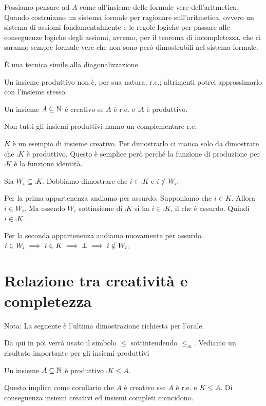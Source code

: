 Possiamo pensare ad $A$ come all'insieme delle formule vere dell'aritmetica. Quando costruiamo un
sistema formale per ragionare sull'aritmetica, ovvero un sistema di assiomi fondamentalmente e le regole
logiche per passare alle conseguenze logiche degli assiomi, avremo, per il teorema di incompletezza,
che ci saranno sempre formule vere che non sono però dimostrabili nel sistema formale.

È una tecnica simile alla diagonalizzazione.

Un insieme produttivo non è, per sua natura, r.e.; altrimenti potrei approssimarlo con l'insieme
stesso.

\begin{defn}
    Un insieme $A \subseteq \mathbb{N}$ è creativo se $A$ è r.e. e $\comp{A}$ è produttivo.
\end{defn}

Non tutti gli insiemi produttivi hanno un complementare r.e.

$K$ è un esempio di insieme creativo. Per dimostrarlo ci manca solo da dimostrare che $\comp{K}$ è
produttivo. Questo è semplice però perché la funzione di produzione per $\comp{K}$ è la funzione
identità.

Sia $W_{i} \subseteq \comp{K}$. Dobbiamo dimostrare che $i \in \comp{K}$ e $i \notin W_{i}$.

Per la prima appartenenza andiamo per assurdo. Supponiamo che $i \in K$. Allora $i \in W_{i}$. Ma
essendo $W_{i}$ sottinsieme di $\comp{K}$ si ha $i \in \comp{K}$, il che è assurdo. Quindi $i \in
\comp{K}$.

Per la seconda appartenenza andiamo nuovamente per assurdo. $i \in W_{i} \implies i \in K \implies
\bot \implies i \notin W_{i}$.

\section{Relazione tra creatività e completezza}

Nota: La seguente è l'ultima dimostrazione richiesta per l'orale.

Da qui in poi verrà usato il simbolo $\leq$ sottintendendo $\leq_{m}$. Vediamo un risultato
importante per gli insiemi produttivi

\begin{thm}
    Un insieme $A \subseteq \mathbb{N}$ è produttivo $\comp{K} \leq A$.
\end{thm}

Questo implica come corollario che $A$ è creativo sse $A$ è r.e. e $K \leq A$. Di conseguenza
insiemi creativi ed insiemi completi coincidono.

